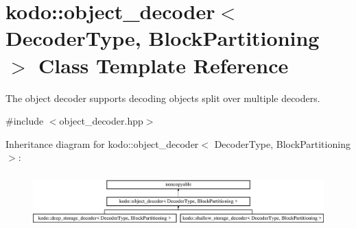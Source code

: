 \hypertarget{classkodo_1_1object__decoder}{\section{kodo\-:\-:object\-\_\-decoder$<$ Decoder\-Type, Block\-Partitioning $>$ Class Template Reference}
\label{classkodo_1_1object__decoder}
}


The object decoder supports decoding objects split over multiple decoders.  




{\ttfamily \#include $<$object\-\_\-decoder.\-hpp$>$}

Inheritance diagram for kodo\-:\-:object\-\_\-decoder$<$ Decoder\-Type, Block\-Partitioning $>$\-:\begin{figure}[H]
\begin{center}
\leavevmode
\includegraphics[height=2.089552cm]{classkodo_1_1object__decoder}
\end{center}
\end{figure}
